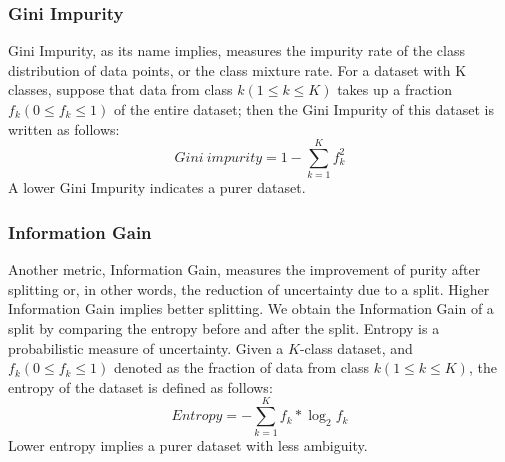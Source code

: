\subsubsection*{Gini Impurity}
Gini Impurity, as its name implies, measures the impurity rate of the class distribution of data points, or the class mixture rate. For a dataset with K classes, suppose that data from class $k(1 \leq k \leq K)$ takes up a fraction $f_k(0 \leq f_k \leq 1)$ of the entire dataset; then the Gini Impurity of this dataset is written as follows:
$$Gini~impurity=1-\sum_{k=1}^Kf_k^2$$
A lower Gini Impurity indicates a purer dataset.

\subsubsection*{Information Gain}
Another metric, Information Gain, measures the improvement of purity after splitting or, in other words, the reduction of uncertainty due to a split. Higher Information Gain implies better splitting. We obtain the Information Gain of a split by comparing the entropy before and after the split. Entropy is a probabilistic measure of uncertainty. Given a $K$-class dataset, and $f_k (0 \leq f_k \leq 1)$ denoted as the fraction of data from class $k (1 \leq k \leq K)$, the entropy of the dataset is defined as follows:
$$Entropy = -\sum_{k=1}^Kf_k*\log_2f_k$$
Lower entropy implies a purer dataset with less ambiguity.